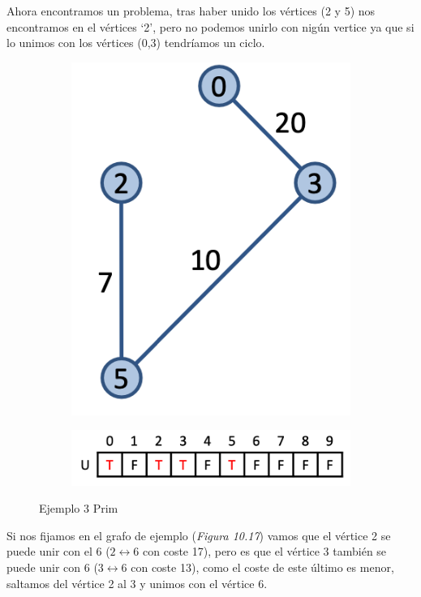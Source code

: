 Ahora encontramos un problema, tras haber unido los vértices (2 y 5) nos encontramos en el vértices `2', pero no podemos unirlo con nigún vertice ya que si lo unimos con los vértices (0,3) tendríamos un ciclo.
\begin{figure}[h]
  \begin{minipage}{0.4\textwidth}
    \centering
    \begin{subfigure}{\textwidth}
      \centering
      \includegraphics[width=.5\textwidth]{assets/prim9.png}
    \end{subfigure}
  \end{minipage}
  \hfill
  \begin{minipage}{0.5\textwidth}
    \centering
    \begin{subfigure}{\textwidth}
      \centering
      \includegraphics[width=.8\textwidth]{assets/prim10.png}
    \end{subfigure}
  \end{minipage}
  \caption{Ejemplo 3 Prim}
\end{figure}
\newpage
Si nos fijamos en el grafo de ejemplo (\textit{Figura 10.17}) vamos que el vértice 2 se puede unir con el 6 (\(2 \leftrightarrow 6\) con coste 17), pero es que el vértice 3 también se puede unir con 6 (\(3 \leftrightarrow 6\) con coste 13), como el coste de este último es menor, saltamos del vértice 2 al 3 y unimos con el vértice 6.

